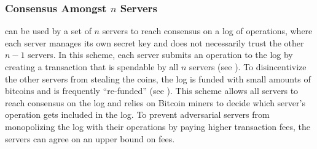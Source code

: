 \subsubsection{Consensus Amongst $n$ Servers}
\Sys can be used by a set of $n$ servers to reach consensus on a log of operations, where each server manages its own secret key and does not necessarily trust the other $n-1$ servers.
In this scheme, each server submits an operation to the log by creating a \Sys transaction that is spendable by all $n$ servers (see ).
To disincentivize the other servers from stealing the coins, the log is funded with small amounts of bitcoins and is frequently ``re-funded'' (see ).
This scheme allows all servers to reach consensus on the log and relies on Bitcoin miners to decide which server's operation gets included in the log.
To prevent adversarial servers from monopolizing the log with their operations by paying higher transaction fees, the servers can agree on an upper bound on fees.


